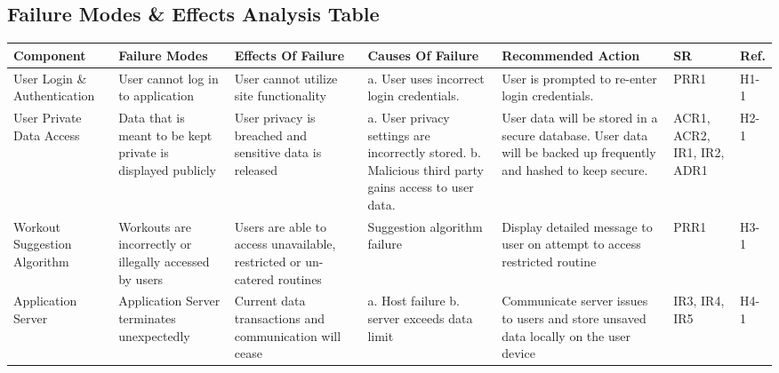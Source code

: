 \documentclass{article}
\begin{document}
	\subsection{Failure Modes \& Effects Analysis Table}
	\begin{adjustwidth}{-3cm}{-1cm}
	\centering
	\noindent\begin{tabular}{ |p{3.3cm}|p{2.5cm}|p{3.2cm}|p{2cm}|p{2.5cm}|p{1cm}|p{1cm}| @{} }
		\hline
		Component & Failure Modes & Effects Of Failure & Causes Of Failure & Recommended Action & SR & Ref.\\
		\hline
		User Login \& Authentication& User cannot log in to application & User cannot utilize site functionality & 
			a. User uses incorrect login credentials.
			& 
			User is prompted to re-enter login credentials.
			& PRR1 & H1-1\\
		\hline
		User Private Data Access & Data that is meant to be kept private is displayed publicly & 
			User privacy is breached and sensitive data is released & 
				a. User privacy settings are incorrectly stored.
				\newline
				b. Malicious third party gains access to user data.
			& 
				User data will be stored in a secure database. User data will be backed up frequently and hashed to keep secure.
			& ACR1, ACR2, IR1, IR2, ADR1 & H2-1\\
		\hline
		Workout Suggestion Algorithm& Workouts are incorrectly or illegally accessed by users& Users are able to access unavailable, restricted or un-catered routines & Suggestion algorithm failure & Display detailed message to user on attempt to access restricted routine & PRR1 &H3-1\\
		\hline
		Application Server& Application Server terminates unexpectedly & Current data transactions and communication will cease& a. Host failure \newline b. server exceeds data limit& Communicate server issues to users and store unsaved data locally on the user device & IR3, IR4, IR5 & H4-1 \\
		\hline

 	\end{tabular}


\end{adjustwidth}
\end{document}
